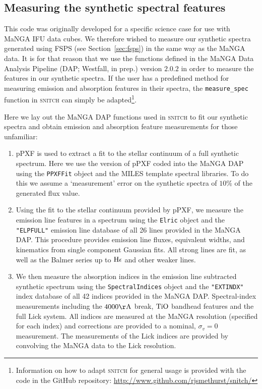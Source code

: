 \documentclass[useAMS,usenatbib]{mn2e}
\begin{document}
\subsection{Measuring the synthetic spectral features}\label{sec:dap}

This code was originally developed for a specific science case for use with MaNGA IFU data cubes. We therefore wished to measure our synthetic spectra generated using FSPS (see Section~\ref{sec:fsps}) in the same way as the MaNGA data. It is for that reason that we use the functions defined in the MaNGA Data Analysis Pipeline (DAP; Westfall, in prep.) version $2.0.2$ in order to measure the features in our synthetic spectra. If the user has a predefined method for measuring emission and absorption features in their spectra, the \texttt{measure\_spec} function in \textsc{snitch} can simply be adapted\footnote{Information on how to adapt \textsc{snitch} for general usage is provided with the code in the GitHub repository: \url{http://www.github.com/rjsmethurst/snitch/}}.

Here we lay out the MaNGA DAP functions used in \textsc{snitch} to fit our synthetic spectra and obtain emission and absorption feature measurements for those unfamiliar:

\begin{enumerate}
\item pPXF \citep{cappellari04} is used to extract a fit to the stellar continuum of a full synthetic spectrum. Here we use the version of pPXF coded into the MaNGA DAP using the \texttt{PPXFFit} object and the MILES template spectral libraries. To do this we assume a `measurement' error on the synthetic spectra of $10\%$ of the generated flux value. 
\item Using the fit to the stellar continuum provided by pPXF, we measure the emission line features in a spectrum using the \texttt{Elric} object and the \texttt{"ELPFULL"} emission line database of all 26 lines provided in the MaNGA DAP. This procedure provides emission line fluxes, equivalent widths, and kinematics from single component Gaussian fits. All strong lines are fit, as well as the Balmer series up to $\rm{H}\epsilon$ and other weaker lines. 
\item We then measure the absorption indices in the emission line subtracted synthetic spectrum using the \texttt{SpectralIndices} object and the \texttt{"EXTINDX"} index database of all 42 indices provided in the MaNGA DAP. Spectral-index measurements including the $4000\rm{\AA}$ break, $\rm{TiO}$ bandhead features and the full Lick system. All indices are measured at the MaNGA resolution (specified for each index) and corrections are provided to a nominal, $\sigma_v = 0$ measurement. The measurements of the Lick indices are provided by convolving the MaNGA data to the Lick resolution. 
\end{enumerate}
\end{document}
